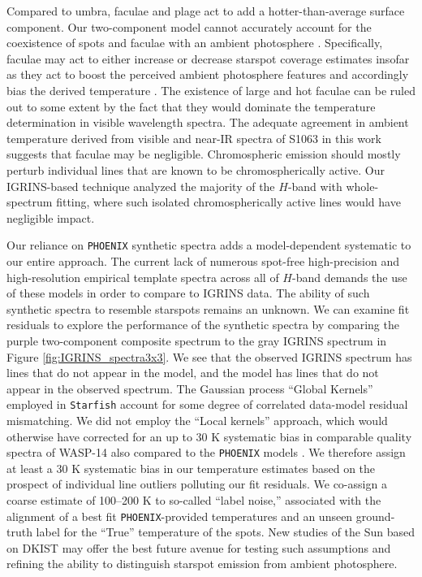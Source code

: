 \documentclass[twocolumn,tighten]{aastex631}
\begin{document}
Compared to umbra, faculae and plage act to add a hotter-than-average surface component. Our two-component model cannot accurately account for the coexistence of spots and faculae with an ambient photosphere \citep{1998A&A...329..747S}. Specifically, faculae may act to either increase or decrease starspot coverage estimates insofar as they act to boost the perceived ambient photosphere features and accordingly bias the derived temperature  \citep{2019AJ....157...11W}. The existence of large and hot faculae can be ruled out to some extent by the fact that they would dominate the temperature determination in visible wavelength spectra.  The adequate agreement in ambient temperature derived from visible \citep{mathieu03} and near-IR spectra of S1063 in this work suggests that faculae may be negligible.  Chromospheric emission should mostly perturb individual lines that are known to be chromospherically active.  Our IGRINS-based technique analyzed the majority of the $H$-band with whole-spectrum fitting, where such isolated chromospherically active lines would have negligible impact.

Our reliance on \texttt{PHOENIX} synthetic spectra adds a model-dependent systematic to our entire approach.  The current lack of numerous spot-free high-precision and high-resolution empirical template spectra across all of $H$-band demands the use of these models in order to compare to IGRINS data.  The ability of such synthetic spectra to resemble starspots remains an unknown.  We can examine fit residuals to explore the performance of the synthetic spectra by comparing the purple two-component composite spectrum to the gray IGRINS spectrum in Figure \ref{fig:IGRINS_spectra3x3}. We see that the observed IGRINS spectrum has lines that do not appear in the model, and the model has lines that do not appear in the observed spectrum. The Gaussian process ``Global Kernels'' employed in \texttt{Starfish} account for some degree of correlated data-model residual mismatching.  We did not employ the ``Local kernels'' approach, which would otherwise have corrected for an up to 30 K systematic bias in comparable quality spectra of WASP-14 also compared to the \texttt{PHOENIX} models \citep{czekala15}.  We therefore assign at least a 30 K systematic bias in our temperature estimates based on the prospect of individual line outliers polluting our fit residuals.  We co-assign a coarse estimate of 100--200 K to so-called ``label noise,'' associated with the alignment of a best fit \texttt{PHOENIX}-provided temperatures and an unseen ground-truth label for the ``True'' temperature of the spots. New studies of the Sun based on DKIST may offer the best future avenue for testing such assumptions and refining the ability to distinguish starspot emission from ambient photosphere.
\end{document}
